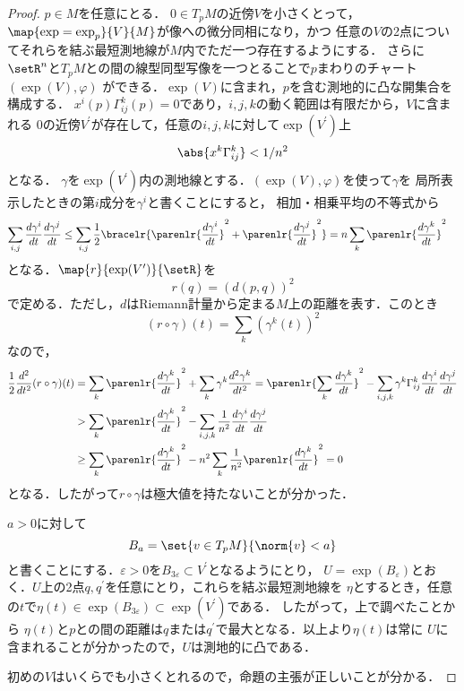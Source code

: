 \documentclass[uplatex]{jsarticle}
\begin{document}
\begin{proof}
  $p\in M$を任意にとる．
  $0\in T_pM$の近傍$V$を小さくとって，$\map{\exp=\exp_p}{V}{M}$が像への微分同相になり，かつ
  任意の$V$の2点についてそれらを結ぶ最短測地線が$M$内でただ一つ存在するようにする．
  さらに$\setR^n$と$T_p M$との間の線型同型写像を一つとることで$p$まわりのチャート$(\exp(V), \varphi)$
  ができる．$\exp(V)$に含まれ，$p$を含む測地的に凸な開集合を構成する．
  $x^i(p)\Gamma_{ij}^k(p) = 0$であり，$i, j, k$の動く範囲は有限だから，$V$に含まれる
  0の近傍$V^\prime$が存在して，任意の$i, j, k$に対して$\exp(V^\prime)$上
    \[\abs{x^k\Gamma_{ij}^k} < 1 / n^2 \]
  となる．
  $\gamma$を$\exp(V^\prime)$内の測地線とする．$(\exp(V),\varphi)$を使って$\gamma$を
  局所表示したときの第$i$成分を$\gamma^i$と書くことにすると，
  相加・相乗平均の不等式から
  \begin{align*}
    \sum_{i, j} \frac{d\gamma^i}{dt} \frac{d\gamma^j}{dt} 
      &\leq \sum_{i, j} \frac{1}{2} \bracelr{\parenlr{\frac{d\gamma^i}{dt}}^2 + 
      \parenlr{\frac{d\gamma^j}{dt}}^2} = n\sum_k \parenlr{\frac{d\gamma^k}{dt}}^2
  \end{align*}
  となる．$\map{r}{\exp(V^\prime)}{\setR}$を
    \[r(q) = (d(p,q))^2 \]
  で定める．ただし，$d$はRiemann計量から定まる$M$上の距離を表す．このとき
  \[(r\circ \gamma)(t) = \sum_k (\gamma^k(t))^2\]
  なので，
  \begin{align*}
    \frac{1}{2}\frac{d^2}{dt^2}(r\circ \gamma)(t)
      &= \sum_k \parenlr{\frac{d\gamma^k}{dt}}^2 + \sum_k \gamma^k \frac{d^2\gamma^k}{dt^2} 
      = \parenlr{\sum_k\frac{d\gamma^k}{dt}}^2 - \sum_{i, j, k} \gamma^k \Gamma_{ij}^k\frac{d\gamma^i}{dt}\frac{d\gamma^j}{dt} \\
    &> \sum_k \parenlr{\frac{d\gamma^k}{dt}}^2 
      - \sum_{i,j,k} \frac{1}{n^2}\frac{d\gamma^i}{dt}\frac{d\gamma^j}{dt} \\
    &\geq \sum_k \parenlr{\frac{d\gamma^k}{dt}}^2 - n^2\sum_k\frac{1}{n^2}\parenlr{\frac{d\gamma^k}{dt}}^2  = 0
  \end{align*}
  となる．したがって$r\circ \gamma$は極大値を持たないことが分かった．
  
  $a>0$に対して
    \[B_a = \set{v\in T_p M}{\norm{v} < a} \]
  と書くことにする．$\varepsilon>0$を$B_{3\varepsilon} \subset V^\prime$となるようにとり，
  $U = \exp(B_\varepsilon)$とおく．$U$上の2点$q, q^\prime$を任意にとり，これらを結ぶ最短測地線を
  $\eta$とするとき，任意の$t$で$\eta(t)\in \exp(B_{3\varepsilon})\subset \exp(V^\prime)$である．
  したがって，上で調べたことから
  $\eta(t)$と$p$との間の距離は$q$または$q^\prime$で最大となる．以上より$\eta(t)$は常に
  $U$に含まれることが分かったので，$U$は測地的に凸である．

  初めの$V$はいくらでも小さくとれるので，命題の主張が正しいことが分かる．
\end{proof}
\end{document}
